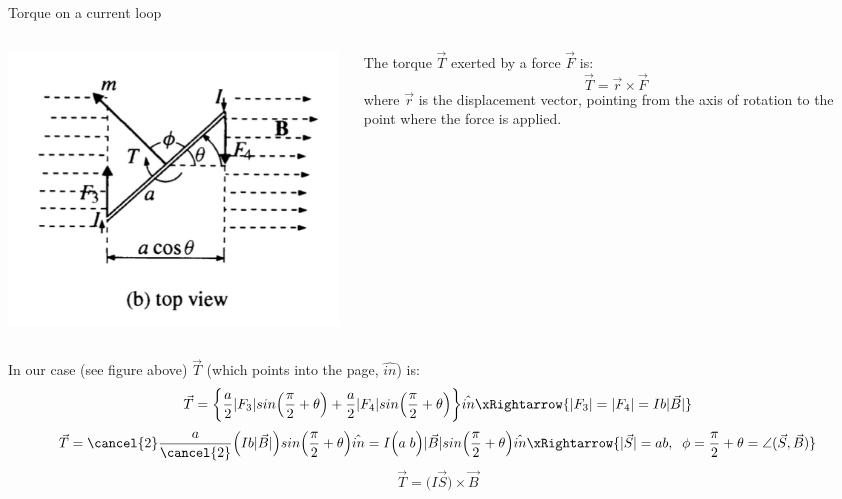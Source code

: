 \begin{frame}{Torque on a current loop}

\begin{columns}
  \begin{column}{0.37\textwidth}
    \includegraphics[width=0.99\textwidth]{./images/schematics/magnetic_torque_current_loop_top_view.png}\\
  \end{column}
  \begin{column}{0.63\textwidth}
  {\small
     The torque $\vec{T}$ exerted by a force $\vec{F}$ is:
     \begin{equation*}
         \vec{T} = \vec{r} \times \vec{F}
     \end{equation*}
      where $\vec{r}$ is the displacement vector,
      pointing from the axis of rotation to the point where the force is applied.
  }
  \end{column}
\end{columns}
In our case (see figure above) $\vec{T}$ (which points into the page, $\hat{in}$) is:
\begin{equation*}
     \vec{T} =
        \bigg\{ \frac{a}{2} |F_{3}| sin \Big(\frac{\pi}{2}+\theta \Big) +
                \frac{a}{2} |F_{4}| sin \Big(\frac{\pi}{2}+\theta \Big) \bigg\} \hat{in}
        \xRightarrow {|F_{3}| = |F_{4}| =  I b |\vec{B}|}
\end{equation*}
\begin{equation*}
      \vec{T} =
         \cancel{2} \frac{a}{\cancel{2}}
            \Big( I b |\vec{B}| \Big) sin\Big(\frac{\pi}{2}+\theta \Big) \hat{in} =
         I \Big( a \; b \Big) |\vec{B}| sin\Big(\frac{\pi}{2}+\theta \Big) \hat{in}
        \xRightarrow {|\vec{S}| = ab,\;\; \phi = \frac{\pi}{2}+\theta = \angle(\vec{S},\vec{B})}
\end{equation*}
\begin{equation*}
      \vec{T} = \Big( I \vec{S} \Big) \times \vec{B}
\end{equation*}

\end{frame}

